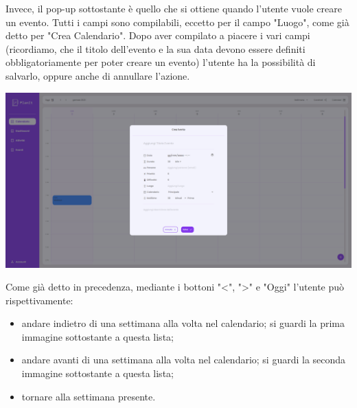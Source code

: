 Invece, il pop-up sottostante è quello che si ottiene quando l'utente vuole creare un evento. Tutti i campi sono compilabili, eccetto per il campo "Luogo", come già detto per "Crea Calendario". Dopo aver compilato a piacere i vari campi (ricordiamo, che il titolo dell'evento e la sua data devono essere definiti obbligatoriamente per poter creare un evento) l'utente ha la possibilità di salvarlo, oppure anche di annullare l'azione.

\begin{center}
    \includegraphics[width=1\textwidth, height=0.3\textheight]{img/png/FrontEnd/Calendario/calendario_creaEvento.png}
\end{center}

Come già detto in precedenza, mediante i bottoni "<", ">" e "Oggi" l'utente può rispettivamente:
\begin{itemize}
    \item andare indietro di una settimana alla volta nel calendario; si guardi la prima immagine sottostante a questa lista;
    \item andare avanti di una settimana alla volta nel calendario; si guardi la seconda immagine sottostante a questa lista;
    \item tornare alla settimana presente.
\end{itemize}


